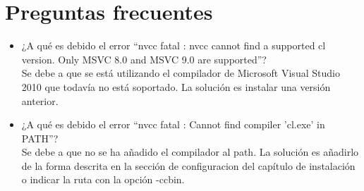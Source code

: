 \section{Preguntas frecuentes}
\begin{itemize}
 \item ¿A qué es debido el error ``nvcc fatal   : nvcc cannot find a
  supported cl version. Only MSVC 8.0 and MSVC 9.0 are supported''?\\
  Se debe a que se está utilizando el compilador de Microsoft Visual Studio 2010
  que todavía no está soportado. La solución es instalar una versión anterior.
 \item ¿A qué es debido el error ``nvcc fatal   : Cannot find compiler 'cl.exe' in PATH''?\\
  Se debe a que no se ha añadido el compilador al path. La solución es añadirlo de la forma
  descrita en la sección de configuracion del capítulo de instalación o indicar la ruta con
  la opción -ccbin.
\end{itemize}
